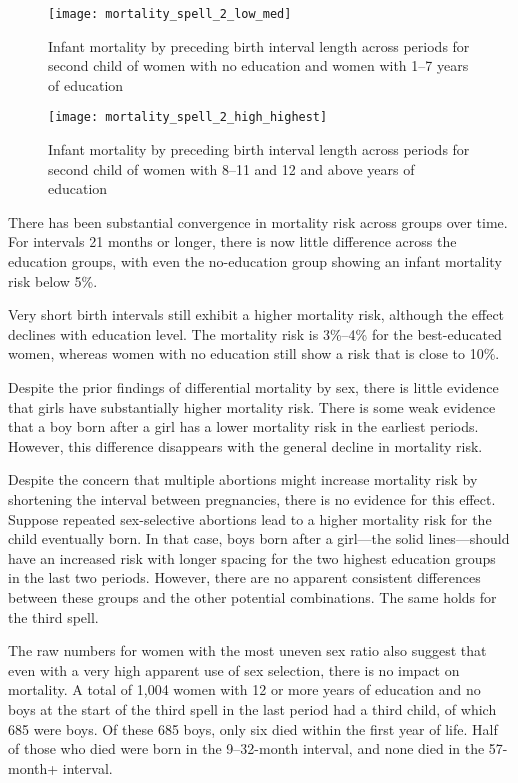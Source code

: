 \documentclass[12pt,letterpaper]{article}
\begin{document}
\begin{figure}
\centering
\texttt{[image: mortality\_spell\_2\_low\_med]}
\caption{Infant mortality by preceding birth interval length across periods for second child of women with 
no education and women with 1--7 years of education}
\label{fig:mortality_low_med}
\end{figure}


\begin{figure}
\centering
\texttt{[image: mortality\_spell\_2\_high\_highest]}
\caption{Infant mortality by preceding birth interval length across periods for second child of women with 
8--11 and 12 and above years of education}
\label{fig:mortality_high_highest}
\end{figure}



There has been substantial convergence in mortality risk across groups over time.
For intervals 21 months or longer, there is now little difference across 
the education groups, with even the no-education group showing an infant mortality risk 
below 5\%.

Very short birth intervals still exhibit a higher mortality risk, although the 
effect declines with education level.
The mortality risk is 3\%--4\% for the best-educated women, whereas women with no 
education still show a risk that is close to 10\%. 

Despite the prior findings of differential mortality by sex, there is little evidence 
that girls have substantially higher mortality risk.
There is some weak evidence that a boy born after a girl has a lower mortality
risk in the earliest periods.
However, this difference disappears with the general decline in mortality risk. 

Despite the concern that multiple abortions might increase mortality risk by shortening 
the interval between pregnancies, there is no evidence for this effect. 
Suppose repeated sex-selective abortions lead to a higher mortality risk for the child
eventually born. 
In that case, boys born after a girl---the solid lines---should have an increased risk 
with longer spacing for the two highest education groups in the last two periods.
However, there are no apparent consistent differences between these groups and the other 
potential combinations. 
The same holds for the third spell.

The raw numbers for women with the most uneven sex ratio also suggest that even with a 
very high apparent use of sex selection, there is no impact on mortality. 
A total of 1,004 women with 12 or more years of education and no boys at the start of 
the third spell in the last period had a third child, of which 685 were boys. 
Of these 685 boys, only six died within the first year of life. 
Half of those who died were born in the 9--32-month interval, and none died in the 
57-month+ interval.
\end{document}
